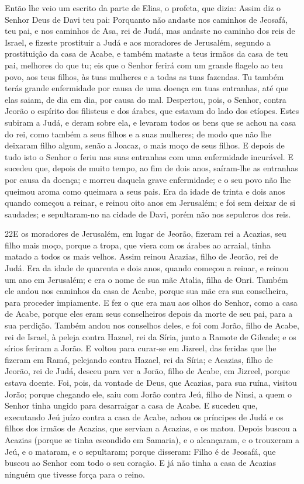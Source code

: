 Então lhe veio um escrito da parte de Elias, o profeta, que
dizia: Assim diz o Senhor Deus de Davi teu pai: Porquanto não
andaste nos caminhos de Jeosafá, teu pai, e nos caminhos de Asa, rei
de Judá, mas andaste no caminho dos reis de Israel, e fizeste
prostituir a Judá e aos moradores de Jerusalém, segundo a
prostituição da casa de Acabe, e também mataste a teus irmãos da
casa de teu pai, melhores do que tu; eis que o Senhor ferirá
com um grande flagelo ao teu povo, aos teus filhos, às tuas mulheres
e a todas as tuas fazendas. Tu também terás grande
enfermidade por causa de uma doença em tuas entranhas, até que elas
saiam, de dia em dia, por causa do mal. Despertou, pois, o
Senhor, contra Jeorão o espírito dos filisteus e dos árabes, que
estavam do lado dos etíopes. Estes subiram a Judá, e deram
sobre ela, e levaram todos os bens que se achou na casa do rei, como
também a seus filhos e a suas mulheres; de modo que não lhe deixaram
filho algum, senão a Joacaz, o mais moço de seus filhos. E
depois de tudo isto o Senhor o feriu nas suas entranhas com uma
enfermidade incurável. E sucedeu que, depois de muito tempo,
ao fim de dois anos, saíram-lhe as entranhas por causa da doença; e
morreu daquela grave enfermidade; e o seu povo não lhe queimou aroma
como queimara a seus pais. Era da idade de trinta e dois anos
quando começou a reinar, e reinou oito anos em Jerusalém; e foi sem
deixar de si saudades; e sepultaram-no na cidade de Davi, porém não
nos sepulcros dos reis.

\medskip

\lettrine{22} E os moradores de Jerusalém, em lugar de Jeorão,
fizeram rei a Acazias, seu filho mais moço, porque a tropa, que
viera com os árabes ao arraial, tinha matado a todos os mais velhos.
Assim reinou Acazias, filho de Jeorão, rei de Judá. Era da idade
de quarenta e dois anos, quando começou a reinar, e reinou um ano em
Jerusalém; e era o nome de sua mãe Atalia, filha de Onri. Também
ele andou nos caminhos da casa de Acabe, porque sua mãe era sua
conselheira, para proceder impiamente. E fez o que era mau aos
olhos do Senhor, como a casa de Acabe, porque eles eram seus
conselheiros depois da morte de seu pai, para a sua perdição.
Também andou nos conselhos deles, e foi com Jorão, filho de
Acabe, rei de Israel, à peleja contra Hazael, rei da Síria, junto a
Ramote de Gileade; e os sírios feriram a Jorão. E voltou para
curar-se em Jizreel, das feridas que lhe fizeram em Ramá, pelejando
contra Hazael, rei da Síria; e Acazias, filho de Jeorão, rei de
Judá, desceu para ver a Jorão, filho de Acabe, em Jizreel, porque
estava doente. Foi, pois, da vontade de Deus, que Acazias, para
sua ruína, visitou Jorão; porque chegando ele, saiu com Jorão contra
Jeú, filho de Ninsi, a quem o Senhor tinha ungido para desarraigar a
casa de Acabe. E sucedeu que, executando Jeú juízo contra a casa
de Acabe, achou os príncipes de Judá e os filhos dos irmãos de
Acazias, que serviam a Acazias, e os matou. Depois buscou a
Acazias (porque se tinha escondido em Samaria), e o alcançaram, e o
trouxeram a Jeú, e o mataram, e o sepultaram; porque disseram: Filho
é de Jeosafá, que buscou ao Senhor com todo o seu coração. E já não
tinha a casa de Acazias ninguém que tivesse força para o reino.

